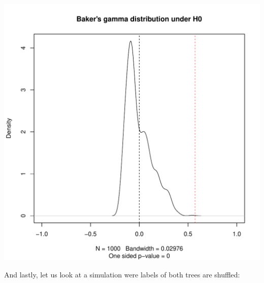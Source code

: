 \documentclass[shortnames,nojss,article]{jss}\usepackage[]{graphicx}\usepackage[]{color}
\makeatletter
\def\maxwidth{ %
  \ifdim\Gin@nat@width>\linewidth
    \linewidth
  \else
    \Gin@nat@width
  \fi
}
\newenvironment{knitrout}{}{} %
\makeatother
\begin{document}
\begin{knitrout}
{\centering \includegraphics[width=\maxwidth]{figure/cor_bakers_gamma_simulation_2} 

}



\end{knitrout}



And lastly, let us look at a simulation were labels of both trees are shuffled:
\end{document}
